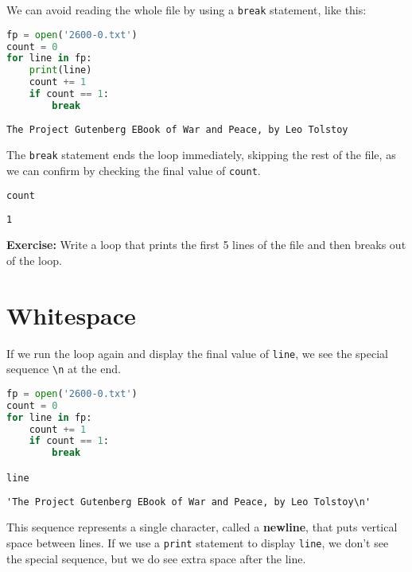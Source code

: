We can avoid reading the whole file by using a
\passthrough{\lstinline!break!} statement, like this:

\begin{lstlisting}[language=Python,style=source]
fp = open('2600-0.txt')
count = 0
for line in fp:
    print(line)
    count += 1
    if count == 1:
        break
\end{lstlisting}

\begin{lstlisting}[style=output]
The Project Gutenberg EBook of War and Peace, by Leo Tolstoy
\end{lstlisting}

The \passthrough{\lstinline!break!} statement ends the loop immediately,
skipping the rest of the file, as we can confirm by checking the final
value of \passthrough{\lstinline!count!}.

\begin{lstlisting}[language=Python,style=source]
count
\end{lstlisting}

\begin{lstlisting}[style=output]
1
\end{lstlisting}

\textbf{Exercise:} Write a loop that prints the first 5 lines of the
file and then breaks out of the loop.

\section{Whitespace}\label{whitespace}

If we run the loop again and display the final value of
\passthrough{\lstinline!line!}, we see the special sequence
\passthrough{\lstinline!\\n!} at the end.

\begin{lstlisting}[language=Python,style=source]
fp = open('2600-0.txt')
count = 0
for line in fp:
    count += 1
    if count == 1:
        break

line
\end{lstlisting}

\begin{lstlisting}[style=output]
'The Project Gutenberg EBook of War and Peace, by Leo Tolstoy\n'
\end{lstlisting}

This sequence represents a single character, called a \textbf{newline},
that puts vertical space between lines. If we use a
\passthrough{\lstinline!print!} statement to display
\passthrough{\lstinline!line!}, we don't see the special sequence, but
we do see extra space after the line.

